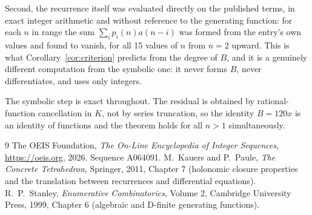 \documentclass[11pt,a4paper]{article}
\theoremstyle{plain}
\theoremstyle{definition}
\begin{document}
Second, the recurrence itself was evaluated directly on the published terms, in exact
integer arithmetic and without reference to the generating function: for each $n$ in range
the sum $\sum_{i}p_{i}(n)a(n-i)$ was formed from the entry's own values and found to
vanish, for all 15 values of $n$ from $n=2$ upward. This is what
Corollary~\ref{cor:criterion} predicts from the degree of $B$, and it is a genuinely
different computation from the symbolic one: it never forms $B$, never differentiates, and
uses only integers.

The symbolic step is exact throughout. The residual is obtained by rational-function
cancellation in $K$, not by series truncation, so the identity $B=120 x$ is an
identity of functions and the theorem holds for all $n>1$ simultaneously.

\begin{thebibliography}{9}
 The OEIS Foundation, \emph{The On-Line Encyclopedia of Integer Sequences},
\url{https://oeis.org}, 2026. Sequence A064091.
 M.~Kauers and P.~Paule, \emph{The Concrete Tetrahedron}, Springer, 2011,
Chapter 7 (holonomic closure properties and the translation between recurrences and
differential equations).
 R.~P.~Stanley, \emph{Enumerative Combinatorics}, Volume 2, Cambridge
University Press, 1999, Chapter 6 (algebraic and D-finite generating functions).
\end{thebibliography}
\end{document}
